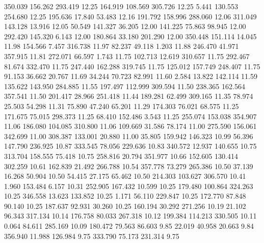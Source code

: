  350.039  156.262  293.419        12.25
 164.919  108.569  305.726        12.25
   5.441  130.553  254.680        12.25
 195.636   17.840   53.483        12.16
 191.792  158.996  288.060        12.06
 311.049  143.128   13.916        12.05
  50.549  141.327   36.205        12.00
 141.225   75.863   98.945        12.00
 292.420  145.320    6.143        12.00
 180.864   33.180  201.290        12.00
 350.448  151.114   14.045        11.98
 154.566    7.457  316.738        11.97
  82.237   49.118    1.203        11.88
 246.470   41.971  357.915        11.81
 272.071   66.597    1.743        11.75
 102.713   12.619  310.657        11.75
 292.467   81.674  332.470        11.75
 247.440  162.288  319.745        11.75
 125.012  157.749  248.407        11.75
  91.153   36.662   20.767        11.69
  34.244   70.723   82.991        11.60
   2.584   13.822  142.114        11.59
 135.622  143.950  284.885        11.55
 197.497  112.999  309.594        11.50
 238.365  162.564  357.541        11.50
 201.417   28.966  251.418        11.44
 189.281   62.499  309.165        11.35
  78.974   25.503   54.298        11.31
  75.890   47.240   65.201        11.29
 174.303   76.021   68.575        11.25
 171.675   75.015  298.373        11.25
  68.410  152.486    3.543        11.25
 255.074  153.038  354.907        11.06
 186.080  104.085  310.800        11.06
 109.669   31.586   78.174        11.00
 275.590  156.061  342.699        11.00
 308.387  133.001   20.880        11.00
  35.805  159.942  146.323        10.99
  56.396  147.790  236.925        10.87
 333.545   78.056  229.636        10.83
 340.572   12.937  140.655        10.75
 313.704  158.555   75.418        10.75
 258.816   20.794  351.977        10.66
 152.605  130.414  302.259        10.61
 162.839   21.492  266.788        10.54
 357.778   73.279  265.386        10.50
  37.139   16.268   50.904        10.50
  54.415   27.175   65.462        10.50
 214.303  103.627  306.570        10.41
   1.960  153.484    6.157        10.31
 252.905  167.432   10.599        10.25
 179.480  100.864  324.263        10.25
 346.558   13.623  133.852        10.25
   1.171   56.110  229.847        10.25
 172.770   87.848   90.140        10.25
 187.637   92.931   30.260        10.25
 160.194   30.292  271.256        10.19
  21.102   96.343  317.134        10.14
 176.758   80.033  267.318        10.12
 199.384  114.213  330.505        10.11
   0.064   84.611  285.169        10.09
 180.472   79.563   86.603         9.85
  22.019   40.958   20.663         9.84
 356.940   11.988  126.984         9.75
 333.790   75.173  231.314         9.75
